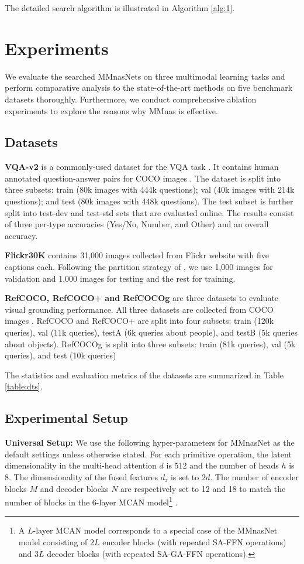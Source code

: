 \documentclass[sigconf]{acmart}
\begin{document}
The detailed search algorithm is illustrated in Algorithm \ref{alg:1}.

\section{Experiments}
We evaluate the searched MMnasNets on three multimodal learning tasks and perform comparative analysis to the state-of-the-art methods on five benchmark datasets thoroughly. Furthermore, we conduct comprehensive ablation experiments to explore the reasons why MMnas is effective.

\subsection{Datasets}
\noindent\textbf{VQA-v2} is a commonly-used dataset for the VQA task \cite{goyal2016making}. It contains human annotated question-answer pairs for COCO images \cite{lin2014microsoft}. The dataset is split into three subsets: {train} (80k images with 444k questions); {val} (40k images with 214k questions); and {test} (80k images with 448k questions). The {test} subset is further split into {test-dev} and {test-std} sets that are evaluated online. The results consist of three per-type accuracies (Yes/No, Number, and Other) and an overall accuracy.

\noindent\textbf{Flickr30K} contains 31,000 images collected from Flickr website with five captions each. Following the partition strategy of \cite{lee2018stacked,karpathy2015deep}, we use 1,000 images for validation and 1,000 images for testing and the rest for training.

\noindent\textbf{RefCOCO, RefCOCO+ and RefCOCOg} are three datasets to evaluate visual grounding performance. All three datasets are collected from COCO images \cite{lin2014microsoft}. RefCOCO and RefCOCO+ are split into four subsets: train (120k queries), val (11k queries), testA (6k queries about people), and testB (5k queries about objects). RefCOCOg is split into three subsets: train (81k queries), val (5k queries), and test (10k queries)

The statistics and evaluation metrics of the datasets are summarized in Table \ref{table:dts}.

\subsection{Experimental Setup}
\noindent\textbf{Universal Setup:} We use the following hyper-parameters for MMnasNet as the default settings unless otherwise stated. For each primitive operation, the latent dimensionality in the multi-head attention $d$ is 512 and the number of heads $h$ is 8. The dimensionality of the fused features $d_z$ is set to $2d$. The number of encoder blocks $M$ and decoder blocks $N$ are respectively set to 12 and 18 to match the number of blocks in the 6-layer MCAN model\footnote{A $L$-layer MCAN model corresponds to a special case of the MMnasNet model consisting of $2L$ encoder blocks (with repeated \textsf{SA}-\textsf{FFN} operations) and $3L$ decoder blocks (with repeated \textsf{SA}-\textsf{GA}-\textsf{FFN} operations).} \cite{yu2019mcan}.
\end{document}
